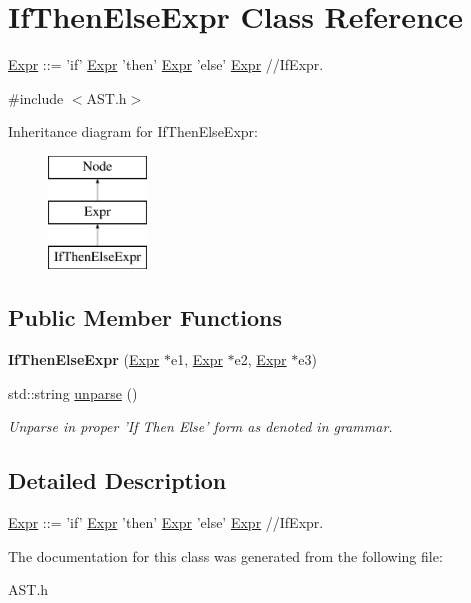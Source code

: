 \hypertarget{classIfThenElseExpr}{\section{If\-Then\-Else\-Expr Class Reference}
\label{classIfThenElseExpr}
}


\hyperlink{classExpr}{Expr} \-:\-:= 'if' \hyperlink{classExpr}{Expr} 'then' \hyperlink{classExpr}{Expr} 'else' \hyperlink{classExpr}{Expr} //\-If\-Expr.  




{\ttfamily \#include $<$A\-S\-T.\-h$>$}

Inheritance diagram for If\-Then\-Else\-Expr\-:\begin{figure}[H]
\begin{center}
\leavevmode
\includegraphics[height=3.000000cm]{classIfThenElseExpr}
\end{center}
\end{figure}
\subsection*{Public Member Functions}
\begin{DoxyCompactItemize}
\item 
\hypertarget{classIfThenElseExpr_a8e5fe13dd7707af3f549f5df53aa5dc3}{{\bfseries If\-Then\-Else\-Expr} (\hyperlink{classExpr}{Expr} $\ast$e1, \hyperlink{classExpr}{Expr} $\ast$e2, \hyperlink{classExpr}{Expr} $\ast$e3)}\label{classIfThenElseExpr_a8e5fe13dd7707af3f549f5df53aa5dc3}

\item 
\hypertarget{classIfThenElseExpr_a1686a9926fe0017d7cf8dd86c7ab79a0}{std\-::string \hyperlink{classIfThenElseExpr_a1686a9926fe0017d7cf8dd86c7ab79a0}{unparse} ()}\label{classIfThenElseExpr_a1686a9926fe0017d7cf8dd86c7ab79a0}

\begin{DoxyCompactList}\small\item\em Unparse in proper 'If Then Else' form as denoted in grammar. \end{DoxyCompactList}\end{DoxyCompactItemize}


\subsection{Detailed Description}
\hyperlink{classExpr}{Expr} \-:\-:= 'if' \hyperlink{classExpr}{Expr} 'then' \hyperlink{classExpr}{Expr} 'else' \hyperlink{classExpr}{Expr} //\-If\-Expr. 

The documentation for this class was generated from the following file\-:\begin{DoxyCompactItemize}
\item 
A\-S\-T.\-h\end{DoxyCompactItemize}
